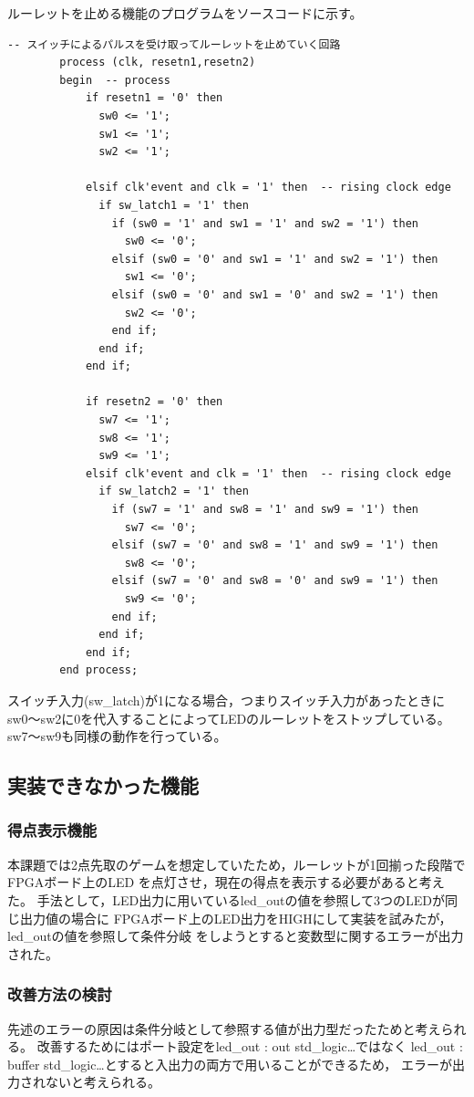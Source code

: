 \documentclass{ltjsarticle}
\begin{document}
		ルーレットを止める機能のプログラムをソースコードに示す。
		\begin{lstlisting}[caption = sample08::ルーレットを止める機能,label = code:rouletteStop]
		  -- スイッチによるパルスを受け取ってルーレットを止めていく回路
		process (clk, resetn1,resetn2)
		begin  -- process
			if resetn1 = '0' then
			  sw0 <= '1';
			  sw1 <= '1';
			  sw2 <= '1';

			elsif clk'event and clk = '1' then  -- rising clock edge
			  if sw_latch1 = '1' then
			    if (sw0 = '1' and sw1 = '1' and sw2 = '1') then
			      sw0 <= '0';
			    elsif (sw0 = '0' and sw1 = '1' and sw2 = '1') then
			      sw1 <= '0';
			    elsif (sw0 = '0' and sw1 = '0' and sw2 = '1') then
			      sw2 <= '0';
			    end if;
			  end if;
			end if;
				
			if resetn2 = '0' then
			  sw7 <= '1';
			  sw8 <= '1';
			  sw9 <= '1';
			elsif clk'event and clk = '1' then  -- rising clock edge
			  if sw_latch2 = '1' then
			    if (sw7 = '1' and sw8 = '1' and sw9 = '1') then
			      sw7 <= '0';
			    elsif (sw7 = '0' and sw8 = '1' and sw9 = '1') then
			      sw8 <= '0';
			    elsif (sw7 = '0' and sw8 = '0' and sw9 = '1') then
			      sw9 <= '0';
			    end if;
			  end if;
		    end if;
		end process;
		\end{lstlisting}
		スイッチ入力(sw\_latch)が1になる場合，つまりスイッチ入力があったときに
		sw0～sw2に0を代入することによってLEDのルーレットをストップしている。
		sw7～sw9も同様の動作を行っている。
	\subsection{実装できなかった機能}
		\subsubsection{得点表示機能}
			本課題では2点先取のゲームを想定していたため，ルーレットが1回揃った段階でFPGAボード上のLED
			を点灯させ，現在の得点を表示する必要があると考えた。
			手法として，LED出力に用いているled\_outの値を参照して3つのLEDが同じ出力値の場合に
			FPGAボード上のLED出力をHIGHにして実装を試みたが，led\_outの値を参照して条件分岐
			をしようとすると変数型に関するエラーが出力された。
		
		\subsubsection{改善方法の検討}
			先述のエラーの原因は条件分岐として参照する値が出力型だったためと考えられる。
			改善するためにはポート設定をled\_out : out std\_logic\dots ではなく
			led\_out : buffer std\_logic\dots とすると入出力の両方で用いることができるため，
			エラーが出力されないと考えられる。
\end{document}
